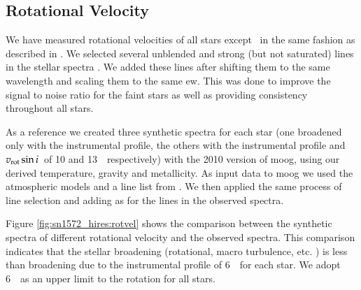 \subsection{Rotational Velocity}
\label{sec:rotation}
We have measured rotational velocities of all stars except \starb\ in the same fashion as described in \wek. We selected several unblended and strong (but not saturated)  lines in the stellar spectra .  We added these lines after shifting them to the same wavelength and scaling them to the same \gls{ew}. This was done to improve the signal to noise ratio for the faint stars as well as providing consistency throughout all stars. 

 As a reference we created three synthetic spectra for each star (one broadened only with the instrumental profile, the others with the instrumental profile and $v_{\textrm{rot}}\sin{i}$\ of 10 and 13~\kms\ respectively) with the 2010 version of \gls{moog}, using our derived temperature, gravity and metallicity.  As input data to \gls{moog} we used the \citet{2004astro.ph..5087C} atmospheric models and a line list from \citet{1995KurCD..23.....K}. We then applied the same process of line selection and adding as for the lines in the observed spectra. 
 
Figure \ref{fig:sn1572_hires:rotvel} shows the comparison between the synthetic spectra of different rotational velocity and the observed spectra. This comparison indicates that the stellar broadening (rotational, macro turbulence, etc. ) is less than broadening due to the instrumental profile of 6~\kms\ for each star. We adopt 6~\kms\ as an upper limit to the rotation for all stars.



